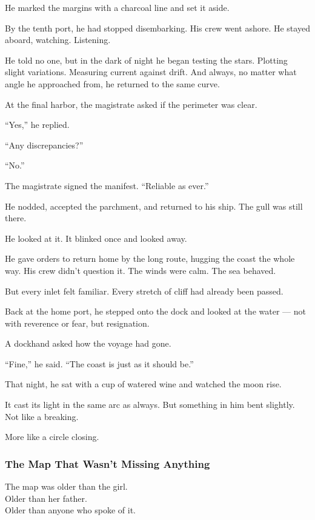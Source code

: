\documentclass[12pt]{article}
\begin{document}
He marked the margins with a charcoal line and set it aside.

By the tenth port, he had stopped disembarking. His crew went ashore. He stayed aboard, watching. Listening.

He told no one, but in the dark of night he began testing the stars. Plotting slight variations. Measuring current against drift. And always, no matter what angle he approached from, he returned to the same curve.

At the final harbor, the magistrate asked if the perimeter was clear.

``Yes,'' he replied.

``Any discrepancies?''

``No.''

The magistrate signed the manifest. ``Reliable as ever.''

He nodded, accepted the parchment, and returned to his ship. The gull was still there.

He looked at it. It blinked once and looked away.

He gave orders to return home by the long route, hugging the coast the whole way. His crew didn’t question it. The winds were calm. The sea behaved.

But every inlet felt familiar. Every stretch of cliff had already been passed.

Back at the home port, he stepped onto the dock and looked at the water — not with reverence or fear, but resignation.

A dockhand asked how the voyage had gone.

``Fine,'' he said. ``The coast is just as it should be.''

That night, he sat with a cup of watered wine and watched the moon rise.

It cast its light in the same arc as always. But something in him bent slightly. Not like a breaking.

More like a circle closing.

\dotfill

\subsubsection{The Map That Wasn’t Missing Anything}

The map was older than the girl.\\
Older than her father.\\
Older than anyone who spoke of it.
\end{document}
